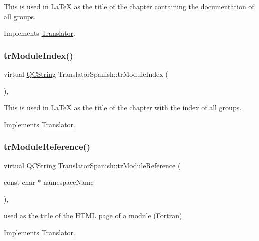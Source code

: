 This is used in La\+TeX as the title of the chapter containing the documentation of all groups. 

Implements \mbox{\hyperlink{class_translator}{Translator}}.

\mbox{\label{class_translator_spanish_a75a375e4c400b4a2db04c3c7538b7367}} 
\subsubsection{\texorpdfstring{trModuleIndex()}{trModuleIndex()}}
{\footnotesize\ttfamily virtual \mbox{\hyperlink{class_q_c_string}{Q\+C\+String}} Translator\+Spanish\+::tr\+Module\+Index (\begin{DoxyParamCaption}{ }\end{DoxyParamCaption})\hspace{0.3cm}{\ttfamily [inline]}, {\ttfamily [virtual]}}

This is used in La\+TeX as the title of the chapter with the index of all groups. 

Implements \mbox{\hyperlink{class_translator}{Translator}}.

\mbox{\label{class_translator_spanish_acdfcff38cd0e140d07d53ecda786bdc3}} 
\subsubsection{\texorpdfstring{trModuleReference()}{trModuleReference()}}
{\footnotesize\ttfamily virtual \mbox{\hyperlink{class_q_c_string}{Q\+C\+String}} Translator\+Spanish\+::tr\+Module\+Reference (\begin{DoxyParamCaption}\item[{const char $\ast$}]{namespace\+Name }\end{DoxyParamCaption})\hspace{0.3cm}{\ttfamily [inline]}, {\ttfamily [virtual]}}

used as the title of the H\+T\+ML page of a module (Fortran) 

Implements \mbox{\hyperlink{class_translator}{Translator}}.

